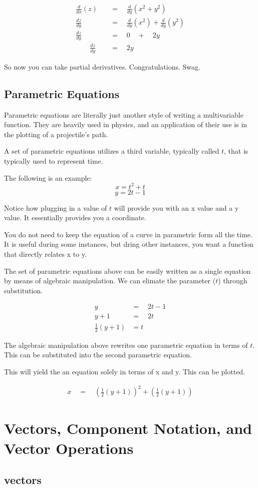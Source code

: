 \documentclass[12pt]{article}
\begin{document}
\begin{align}
\frac { d }{ dx }(z)\quad&=\quad\frac { d }{ dy } ({ x }^{ 2 }+{ y }^{ 2 }) \\
\frac { dz }{ dy }\quad&=\quad\frac { d }{ dy } ({ x }^{ 2 })+\frac { d }{ dy } ({ y }^{ 2 }) \\
\frac { dz }{ dy }\quad&=\quad0\quad +\quad2y \\
\quad \quad \frac { dz }{ dy }\quad&=\quad2y
\end{align}

So now you can take partial derivatives. Congratulations. Swag.

\subsection{Parametric Equations}

Parametric equations are literally just another style of writing a multivariable function. They are heavily used in physics, and an application of their use is in the plotting of a projectile's path.

A set of parametric equations utilizes a third variable, typically called $t$, that is typically used to represent time.

The following is an example:$$x = t^2 + t$$$$y  =2t - 1$$

Notice how plugging in a value of $t$ will provide you with an x value and a y value. It essentially provides you a coordinate.

You do not need to keep the equation of a curve in parametric form all the time. It is useful during some instances, but dring other instances, you want a function that directly relates x to y.

The set of parametric equations above can be easily written as a single equation by means of algebraic manipulation. We can elimate the parameter ($t$) through substitution.

\begin{align*}
y\quad&=\quad2t-1\\
y+1&=\quad2t\\
\frac{ 1 }{ 2 }(y+1)&=t
\end{align*}

The algebraic manipulation above rewrites one parametric equation in terms of $t$. This can be substituted into the second parametric equation.

This will yield the an equation solely in terms of x and y. This can be plotted.

\begin{align*}
x\quad=\quad \left( \frac { 1 }{ 2 } (y+1) \right) ^{ 2 }+\left( \frac { 1 }{ 2 } (y+1) \right) 
\end{align*}

\section{Vectors, Component Notation, and Vector Operations}

\subsection{vectors}
\end{document}
